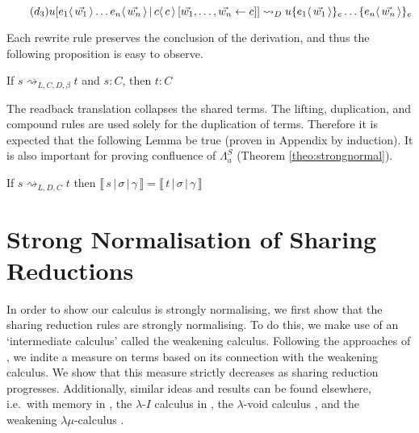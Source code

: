 \documentclass[a4paper,UKenglish,cleveref, autoref]{lipics-v2019}
\newcommand{\FALC}{\Lambda^{S}_{a}}
\newcommand{\share}[3]{#1 [#2 \leftarrow #3]}
\newcommand{\dist}[5]{#1 [ #2 \, \vert \, \fakedist{#4}{#5} \, #3 ]}
\newcommand{\fakedist}[2]{#1 \langle \, #2 \, \rangle}
\newcommand{\exor}[3]{#1 \{ \fakedist{#2}{#3} \}_{e}}
\newcommand{\readbackwmap}[3]{\llbracket \, #1 \, \vert \, #2 \, \vert \, #3  \, \rrbracket }
\newcommand{\distrule}{d}
\newcommand{\sharerule}{\triangle}
\newcommand{\lamrule}{\lambda}
\begin{document}
\begin{equation} \label{red:distelim} \tag{$d_{3}$}
\dist{u}{\fakedist{e_{1}}{\vec{w_{1}}} \dots \fakedist{e_{n}}{\vec{w_{n}}}}{\share{}{\vec{w_{1}}, \dots, \vec{w_{n}}}{c}}{c}{c} \rightsquigarrow_{D} \exor{\exor{u}{e_{1}}{\vec{w_{1}}} \dots}{e_{n}}{\vec{w_{n}}}
\end{equation}
\begin{center}
\drv{ ; -[\lamrule] ; A \rightarrow \drv{A ; -[\sharerule] ; A \wedge A} ; -[\distrule] ; (A \rightarrow A) \wedge (A \rightarrow A)}
\hspace{0.5cm}
\drv{\drv{ ; -[\lamrule] ; A \rightarrow A} \wedge \drv{ ; -[\lamrule] ; A \rightarrow A}}
\end{center}

\noindent Each rewrite rule preserves the conclusion of the derivation, and thus the following proposition is easy to observe.

\begin{proposition}
If $s \rightsquigarrow_{L, C, D, \beta} t$ and $s : C$, then $t : C$
\end{proposition}

\noindent The readback translation collapses the shared terms. The lifting, duplication, and compound rules are used solely for the duplication of terms. Therefore it is expected that the following Lemma be true (proven in Appendix by induction). It is also important for proving confluence of $\FALC$ (Theorem \ref{theo:strongnormal}).

\begin{lemma}
\label{lem:preservesdenotation}
 If $s \rightsquigarrow_{L, D, C} t$ then $\readbackwmap{s}{\sigma}{\gamma} = \readbackwmap{t}{\sigma}{\gamma}$
\end{lemma}

\section{Strong Normalisation of Sharing Reductions}
\label{chap:snosr}

In order to show our calculus is strongly normalising, we first show that the sharing reduction rules are strongly normalising. To do this, we make use of an `intermediate calculus' called the weakening calculus. Following the approaches of \cite{gundersen2013atomic}, we indite a measure on terms based on its connection with the weakening calculus. We show that this measure strictly decreases as sharing reduction progresses. Additionally, similar ideas and results can be found elsewhere, i.e.\ with memory in \cite{klop1980thesis}, the $\lambda$-$I$ calculus in \cite{barendregt1984lambda}, the $\lambda$-void calculus \cite{kesneraccattoli12}, and the weakening $\lambda\mu$-calculus \cite{he2018atomic}.
\end{document}

